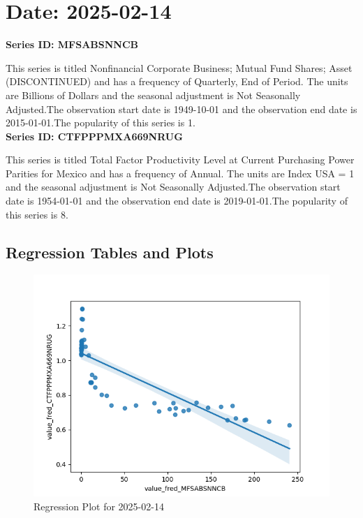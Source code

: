 \section{Date: 2025-02-14}
\noindent \textbf{Series ID: MFSABSNNCB} 

\noindent This series is titled Nonfinancial Corporate Business; Mutual Fund Shares; Asset (DISCONTINUED) and has a frequency of Quarterly, End of Period. The units are Billions of Dollars and the seasonal adjustment is Not Seasonally Adjusted.The observation start date is 1949-10-01 and the observation end date is 2015-01-01.The popularity of this series is 1. \\ 

\noindent \textbf{Series ID: CTFPPPMXA669NRUG} 

\noindent This series is titled Total Factor Productivity Level at Current Purchasing Power Parities for Mexico and has a frequency of Annual. The units are Index USA = 1 and the seasonal adjustment is Not Seasonally Adjusted.The observation start date is 1954-01-01 and the observation end date is 2019-01-01.The popularity of this series is 8. \\ 

\subsection{Regression Tables and Plots}


\begin{figure}
\centering
\includegraphics[scale = 0.9]{plots/plot_2025-02-14.png}
\caption{Regression Plot for 2025-02-14}
\end{figure}
\newpage
